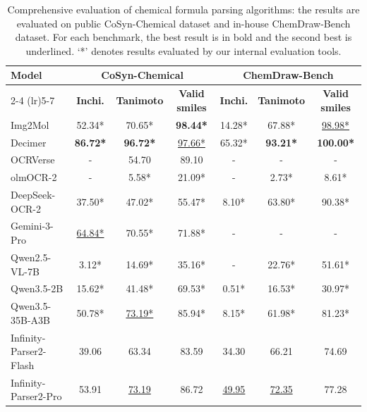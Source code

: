 \begin{table}[htbp]
\centering
\caption{Comprehensive evaluation of chemical formula parsing algorithms: the results are evaluated on public CoSyn-Chemical dataset and in-house ChemDraw-Bench dataset. For each benchmark, the best result is in bold and the second best is underlined. `*' denotes results evaluated by our internal evaluation tools.}
\label{tab:chem_formula_parsing}
\small
\begin{tabular}{lcccccc}
\toprule
\multirow{2}{*}{\textbf{Model}} & \multicolumn{3}{c}{\textbf{CoSyn-Chemical}} & \multicolumn{3}{c}{\textbf{ChemDraw-Bench}}\\
 \cmidrule(lr){2-4} \cmidrule(lr){5-7}
 & \textbf{Inchi.} & \textbf{Tanimoto} & \textbf{Valid smiles} & \textbf{Inchi.} & \textbf{Tanimoto} & \textbf{Valid smiles} \\
\midrule
Img2Mol & 52.34* & 70.65* & \textbf{98.44*} & 14.28* & 67.88* & \underline{98.98*} \\
Decimer & \textbf{86.72*} & \textbf{96.72*} & \underline{97.66*} & 65.32* & \textbf{93.21*} & \textbf{100.00*} \\
\midrule
OCRVerse & - & 54.70 & 89.10 & - & - & - \\
olmOCR-2 & - & 5.58* & 21.09* & - & 2.73* & 8.61* \\
DeepSeek-OCR-2 & 37.50* & 47.02* & 55.47* & 8.10* & 63.80* & 90.38* \\
\midrule
Gemini-3-Pro & \underline{64.84*} & 70.55* & 71.88* & - & - & - \\
Qwen2.5-VL-7B & 3.12* & 14.69* & 35.16* & - & 22.76* & 51.61* \\
Qwen3.5-2B & 15.62* & 41.48* & 69.53* & 0.51* & 16.53* & 30.97* \\
Qwen3.5-35B-A3B & 50.78* & \underline{73.19*} & 85.94* & 8.15* & 61.98* & 81.23* \\
\midrule
Infinity-Parser2-Flash & 39.06 & 63.34 & 83.59 & 34.30 & 66.21 & 74.69 \\
Infinity-Parser2-Pro & 53.91 & \underline{73.19} & 86.72 & \underline{49.95} & \underline{72.35} & 77.28 \\
\bottomrule
\end{tabular}
\end{table}

